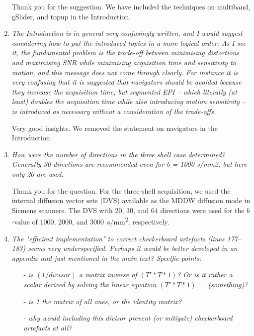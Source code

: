 \documentclass[a4paper,11pt,twoside]{report}
\begin{document}
\begin{enumerate}
    \hspace{1em} Thank you for the suggestion.
    We have included the techniques on multiband, gSlider, and topup
    in the Introduction.

    \item \textit{The Introduction is in general very confusingly written, and I would suggest considering how to put the introduced topics in a more logical order. As I see it, the fundamental problem is the trade-off between minimising distortions and maximising SNR while minimising acquisition time and sensitivity to motion, and this message does not come through clearly. For instance it is very confusing that it is suggested that navigators should be avoided because they increase the acquisition time, but segmented EPI -- which literally (at least) doubles the acquisition time while also introducing motion sensitivity -- is introduced as necessary without a consideration of the trade-offs.}

    \hspace{1em} Very good insights.
    We removed the statement on navigators in the Introduction.

    \item \textit{How were the number of directions in the three shell case determined? Generally 30 directions are recommended even for b = 1000 s/mm2, but here only 20 are used.}

    \hspace{1em} Thank you for the question.
    For the three-shell acquisition, we used the internal diffusion vector sets (DVS)
    available as the MDDW diffusion mode in Siemens scanners.
    The DVS with 20, 30, and 64 directions were used
    for the $b$-value of \num{1000}, \num{2000}, and \SI{3000}{s/mm^2},
    respectively.

    \item \textit{The "efficient implementation" to correct checkerboard artefacts (lines 177--183) seems very underspecified. Perhaps it would be better developed in an appendix and just mentioned in the main text? Specific points:}
        \begin{itemize}
            \item [-] \textit{is $(1/divisor)$ a matrix inverse of $(T'*T*1)$? Or is it rather a scalar derived by solving the linear equation $(T'*T*1) =$ (something)?}
            \item [-] \textit{is 1 the matrix of all ones, or the identity matrix?}
            \item [-] \textit{why would including this divisor prevent (or mitigate) checkerboard artefacts at all?}
        \end{itemize}
\end{enumerate}
\end{document}
